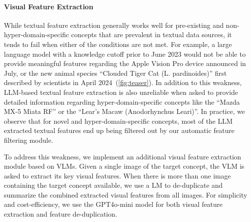 
\vspace{-1em}
\paragraph*{Visual Feature Extraction}
\label{subsec:visual_feature_extraction}

While textual feature extraction generally works well for pre-existing and non-hyper-domain-specific concepts that are prevalent in textual data sources, it tends to fail when either of the conditions are not met. For example, a large language model with a knowledge cutoff prior to June 2023 would not be able to provide meaningful features regarding the Apple Vision Pro device announced in July, or the new animal species ``Clouded Tiger Cat (L. pardinoides)'' first described by scientists in April 2024~(\ref{fig:teaser}). In addition to this weakness, LLM-based textual feature extraction is also unreliable when asked to provide detailed information regarding hyper-domain-specific concepts like the ``Mazda MX-5 Miata RF'' or the ``Lear's Macaw (Anodorhynchus Leari)''. In practice, we observe that for novel and hyper-domain-specific concepts, most of the LLM extracted textual features end up being filtered out by our automatic feature filtering module.


To address this weakness, we implement an additional visual feature extraction module based on VLMs. Given a single image of the target concept, the VLM is asked to extract its key visual features. When there is more than one image containing the target concept available, we use a LM to de-duplicate and summarize the combined extracted visual features from all images. For simplicity and cost-efficiency, we use the GPT4o-mini model for both visual feature extraction and feature de-duplication.


